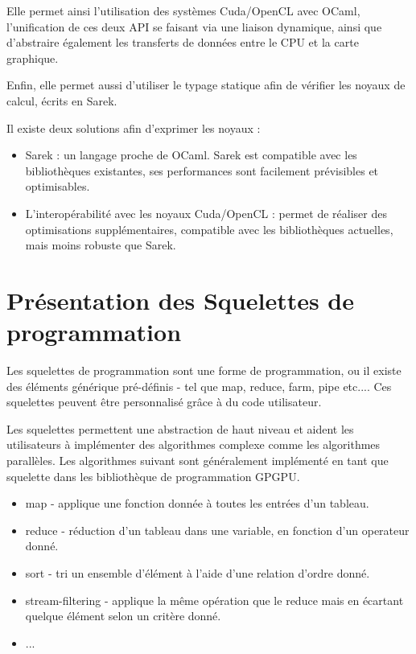 \documentclass{report}
\begin{document}
Elle permet ainsi l’utilisation des systèmes Cuda/OpenCL avec OCaml, l’unification de ces deux API se faisant via une liaison dynamique, ainsi que d’abstraire également les transferts de données entre le CPU et la carte graphique.\newline

Enfin, elle permet aussi d’utiliser le typage statique afin de vérifier les noyaux de calcul, écrits en Sarek.\newline

Il existe deux solutions afin d’exprimer les noyaux :
\begin{itemize}

\item Sarek : un langage proche de OCaml. Sarek est compatible avec les bibliothèques existantes, ses performances sont facilement prévisibles et optimisables.

\item L’interopérabilité avec les noyaux Cuda/OpenCL : permet de réaliser des optimisations supplémentaires, compatible avec les bibliothèques actuelles, mais moins robuste que Sarek.


\end{itemize}

\section{Présentation des Squelettes de programmation}
Les squelettes de programmation sont une forme de programmation, ou il existe des éléments générique pré-définis - tel que map, reduce, farm, pipe etc.... Ces squelettes peuvent être personnalisé grâce à du code utilisateur.\newline

Les squelettes permettent une abstraction de haut niveau et aident les utilisateurs à implémenter des algorithmes complexe comme les algorithmes parallèles. Les algorithmes suivant sont généralement implémenté en tant que squelette dans les bibliothèque de programmation GPGPU.\newline

\begin{itemize}
\item map - applique une fonction donnée à toutes les entrées d’un tableau.
\item reduce - réduction d’un tableau dans une variable, en fonction d’un operateur donné.
\item sort - tri un ensemble d’élément à l’aide d’une relation d’ordre donné.
\item stream-filtering - applique la même opération que le reduce mais en écartant quelque élément selon un critère donné.
\item ...
\end{itemize}
\end{document}
